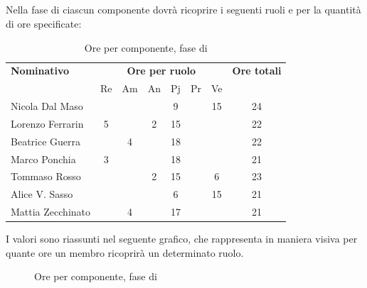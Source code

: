 \subsection{\PD}
Nella fase di \PD ciascun componente dovrà ricoprire i seguenti ruoli e per la quantità di ore specificate:

\begin{table}[H]
	\centering
	\begin{tabular}{|l|c|c|c|c|c|c|c|}
		\hline
		\textbf{Nominativo} & 
		\multicolumn{6}{c|}{\textbf{Ore per ruolo}} & 
		\textbf{Ore totali} \\
		& Re & Am & An & Pj & Pr & Ve & \\
		\hline
		Nicola Dal Maso & & & &9 & &15 & 24 \\
		Lorenzo Ferrarin &5 & &2 &15 & & & 22 \\
		Beatrice Guerra & &4 & &18 & & & 22 \\
		Marco Ponchia &3 & & &18 & & & 21 \\
		Tommaso Rosso & & &2 &15 & &6 & 23 \\
		Alice V. Sasso & & & &6 & &15 & 21 \\
		Mattia Zecchinato & &4 & &17 & & & 21 \\
		\hline
	\end{tabular}
	\caption{Ore per componente, fase di \PD}
\end{table}
I valori sono riassunti nel seguente grafico, che rappresenta in maniera visiva per quante ore un membro ricoprirà un determinato ruolo.
\begin{figure}[H]
	\centering
	\caption{Ore per componente, fase di \PD}
\end{figure}

